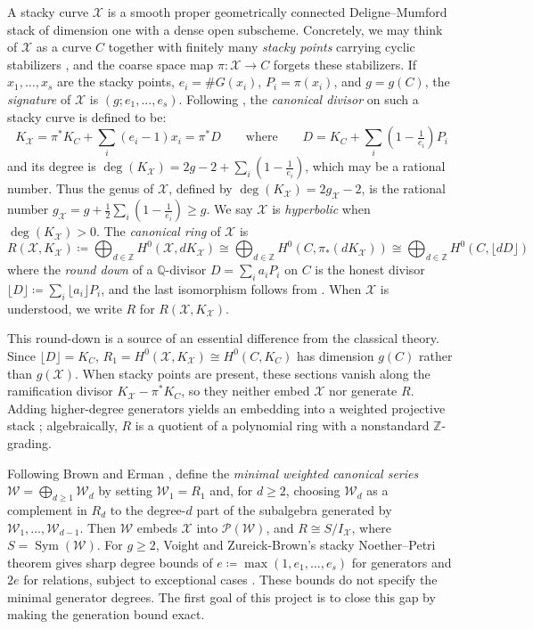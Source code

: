 \documentclass[11pt,reqno]{amsart}
\theoremstyle{remark}
\newcommand{\Sym}{\operatorname{Sym}} %
\newcommand{\defi}[1]{\textsf{#1}} %
\newcommand{\QQ}{\mathbb{Q}}
\newcommand{\ZZ}{\mathbb{Z}}
\newcommand{\cP}{\mathcal{P}}
\newcommand{\cW}{\mathcal{W}}
\newcommand{\cX}{\mathcal{X}}
\begin{document}
A \defi{stacky curve} $\cX$ is a smooth proper geometrically connected Deligne--Mumford stack of dimension one with a dense open subscheme. Concretely, we may think of $\cX$ as a curve $C$ together with finitely many \emph{stacky points} carrying cyclic stabilizers \cite[Lem.~5.3.10]{voightZurieckBrown22}, and the coarse space map $\pi\colon \cX \to C$ forgets these stabilizers. If $x_1,\ldots,x_s$ are the stacky points, $e_i = \#G(x_i)$, $P_i = \pi(x_i)$, and $g = g(C)$, the \emph{signature} of $\cX$ is $(g;e_1,\ldots,e_s)$. Following \cite{voightZurieckBrown22}, the \emph{canonical divisor} on such a stacky curve is defined to be:
\begin{equation}\label{eq:floor}
	K_{\cX}=\pi^*K_C+\sum_{i}\left(e_i-1\right) x_i = \pi^*D \qquad \text{where} \qquad D=K_{C}+\sum_{i}\left(1-\tfrac{1}{e_i}\right)P_i
\end{equation}
and its degree is $\deg(K_{\cX}) = 2g-2+\sum_i(1-\tfrac1{e_i})$, which may be a rational number. Thus the genus of $\cX$, defined by $\deg(K_{\cX}) = 2g_{\cX}-2$, is the rational number $g_{\cX} = g+\tfrac{1}{2}\sum_i(1-\tfrac{1}{e_i})\geq g$. We say $\cX$ is \emph{hyperbolic} when $\deg(K_{\cX})>0$. The \emph{canonical ring} of $\cX$ is
\[
R\left(\cX,K_{\cX}\right) \coloneqq \bigoplus_{d\in \ZZ} H^0\left(\cX, dK_{\cX}\right) \cong \bigoplus_{d\in \ZZ} H^0\left(C, \pi_*(dK_{\cX})\right)  \cong \bigoplus_{d\in \ZZ} H^0\left(C, \lfloor dD \rfloor\right) 
\]
where the \emph{round down} of a $\QQ$-divisor $D=\sum_i a_iP_i$ on $C$ is the honest divisor $\lfloor D\rfloor \coloneqq \sum_i \lfloor a_i\rfloor P_i$, and the last isomorphism follows from  \cite[\S5.4]{voightZurieckBrown22}. When $\cX$ is understood, we write $R$ for $R(\cX, K_{\cX})$. 


This round-down is a source of an essential difference from the classical theory. Since $\lfloor D\rfloor=K_C$, $R_1=H^0(\cX,K_{\cX})\cong H^0(C,K_C)$ has dimension $g(C)$ rather than $g(\cX)$. When stacky points are present, these sections vanish along the ramification divisor $K_{\cX}-\pi^*K_C$, so they neither embed $\cX$ nor generate $R$. Adding higher-degree generators yields an embedding into a weighted projective stack \cite{braggOlssonWebb24}; algebraically, $R$ is a quotient of a polynomial ring with a nonstandard $\ZZ$-grading.

Following Brown and Erman \cite[\S2]{brownErman25}, define the \emph{minimal weighted canonical series} $\cW=\bigoplus_{d\geq1}\cW_d$ by setting $\cW_1=R_1$ and, for $d\geq2$, choosing $\cW_d$ as a complement in $R_d$ to the degree-$d$ part of the subalgebra generated by $\cW_1,\ldots,\cW_{d-1}$. Then $\cW$ embeds $\cX$ into $\cP(\cW)$, and $R\cong S/I_{\cX}$, where $S=\Sym(\cW)$. For $g\geq2$, Voight and Zureick-Brown's stacky Noether--Petri theorem gives sharp degree bounds of $e\coloneqq\max(1,e_1,\ldots,e_s)$ for generators and $2e$ for relations, subject to exceptional cases \cite[Cor.~1.4.2]{voightZurieckBrown22}. These bounds do not specify the minimal generator degrees. The first goal of this project is to close this gap by making the generation bound exact.
\end{document}
